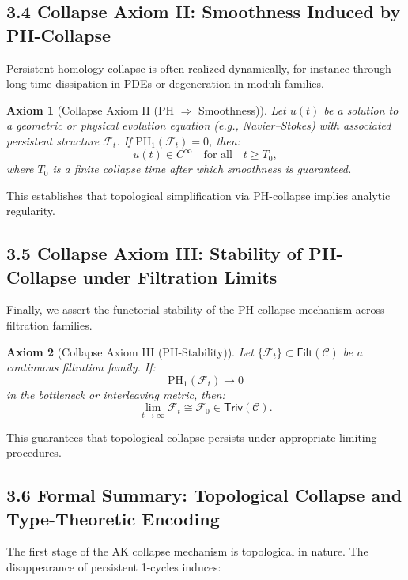 \documentclass[11pt]{article}
\newtheorem{axiom}{Axiom}[section]
\begin{document}
\subsection*{3.4 Collapse Axiom II: Smoothness Induced by PH-Collapse}

Persistent homology collapse is often realized dynamically, for instance through long-time dissipation in PDEs or degeneration in moduli families.

\begin{axiom}[Collapse Axiom II (PH $\Rightarrow$ Smoothness)]
Let \( u(t) \) be a solution to a geometric or physical evolution equation (e.g., Navier–Stokes) with associated persistent structure \( \mathcal{F}_t \).  
If \( \mathrm{PH}_1(\mathcal{F}_t) = 0 \), then:
\[
u(t) \in C^\infty \quad \text{for all} \quad t \geq T_0,
\]
where \( T_0 \) is a finite collapse time after which smoothness is guaranteed.
\end{axiom}

This establishes that topological simplification via PH-collapse implies analytic regularity.

\subsection*{3.5 Collapse Axiom III: Stability of PH-Collapse under Filtration Limits}

Finally, we assert the functorial stability of the PH-collapse mechanism across filtration families.

\begin{axiom}[Collapse Axiom III (PH-Stability)]
Let \( \{ \mathcal{F}_t \} \subset \mathsf{Filt}(\mathcal{C}) \) be a continuous filtration family.  
If:
\[
\mathrm{PH}_1(\mathcal{F}_t) \longrightarrow 0
\]
in the bottleneck or interleaving metric, then:
\[
\lim_{t \to \infty} \mathcal{F}_t \cong \mathcal{F}_0 \in \mathsf{Triv}(\mathcal{C}).
\]
\end{axiom}

This guarantees that topological collapse persists under appropriate limiting procedures.

\subsection*{3.6 Formal Summary: Topological Collapse and Type-Theoretic Encoding}

The first stage of the AK collapse mechanism is topological in nature. The disappearance of persistent 1-cycles induces:
\end{document}
